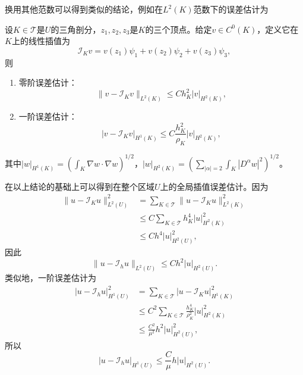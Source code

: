 \documentclass[a4paper,10pt]{ctexart}
\begin{document}
换用其他范数可以得到类似的结论，例如在$ L^2(K) $范数下的误差估计为
\begin{theorem}
    设$ K\in \mathcal{T} $是$ U $的三角剖分，$ z_1,z_2,z_3 $是$ K $的三个顶点。给定$ v\in C^0(K) $，定义它在$ K $上的线性插值为
    \begin{equation}
        \mathcal{I}_K v = v(z_1)\psi_1 + v(z_2)\psi_2 + v(z_3)\psi_3,
    \end{equation}
    则
    \begin{enumerate}
        \item 零阶误差估计：
        \begin{equation}
            \| v-\mathcal{I}_K v \|_{L^2(K)} \leqslant Ch_K^2 |v|_{H^2(K)},
        \end{equation}
        \item 一阶误差估计：
        \begin{equation}
            |v-\mathcal{I}_K v|_{H^1(K)} \leqslant C\frac{h_K^2}{\rho_K}|v|_{H^2(K)},
        \end{equation}
    \end{enumerate}
    其中$ |w|_{H^1(K)} = (\int_K \nabla w\cdot \nabla w)^{1 / 2} $，$ |w|_{H^2(K)} = (\sum_{|\alpha|=2}\int_K |D^\alpha w|^2)^{1 / 2} $。
\end{theorem}

在以上结论的基础上可以得到在整个区域$ U $上的全局插值误差估计。因为
\[
    \begin{aligned}
        \| u - \mathcal{I}_K u \|_{L^2(U)}^2 &= \sum_{K\in \mathcal{T}}\| u - \mathcal{I}_K u \|_{L^2(K)}^2\\
        &\leqslant C\sum_{K\in \mathcal{T}}h_K^4|u|_{H^2(K)}^2\\
        &\leqslant Ch^4|u|_{H^2(U)}^2,
    \end{aligned}
\]
因此
\begin{equation}
    \| u - \mathcal{I}_h u \|_{L^2(U)} \leqslant Ch^2|u|_{H^2(U)}.
\end{equation}
类似地，一阶误差估计为
\[
    \begin{aligned}
        |u-\mathcal{I}_h u|_{H^1(U)}^2 &= \sum_{K\in \mathcal{T}}|u-\mathcal{I}_K u|_{H^1(K)}^2\\
        &\leqslant C^2\sum_{K\in \mathcal{T}}\frac{h_K^4}{\rho_K^2}|u|_{H^2(K)}^2\\
        &\leqslant \frac{C^2}{\mu^2}h^2|u|_{H^2(U)}^2,
    \end{aligned}  
\]
所以
\begin{equation}
    |u-\mathcal{I}_h u|_{H^1(U)} \leqslant \frac{C}{\mu}h|u|_{H^2(U)}.
\end{equation}
\end{document}
